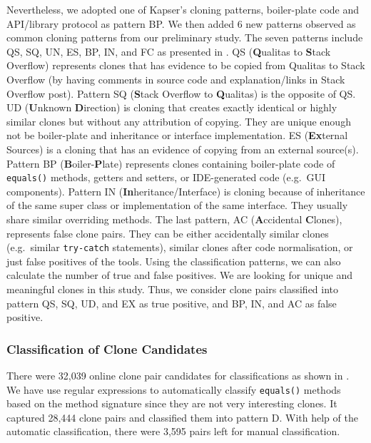 \documentclass{sig-alternate-05-2015}
\begin{document}
Nevertheless, we adopted one of Kapser's cloning patterns, boiler-plate code and API/library protocol as pattern BP. We then added 6 new patterns observed as common cloning patterns from our preliminary study. The seven patterns include QS, SQ, UN, ES, BP, IN, and FC as presented in . QS (\textbf{Q}ualitas to \textbf{S}tack Overflow) represents clones that has evidence to be copied from Qualitas to Stack Overflow (by having comments in source code and explanation/links in Stack Overflow post). Pattern SQ (\textbf{S}tack Overflow to \textbf{Q}ualitas) is the opposite of QS. UD (\textbf{U}nknown \textbf{D}irection) is cloning that creates exactly identical or highly similar clones but without any attribution of copying. They are unique enough not be boiler-plate and inheritance or interface implementation. ES (\textbf{Ex}ternal Sources) is a cloning that has an evidence of copying from an external source(s). Pattern BP (\textbf{B}oiler-\textbf{P}late) represents clones containing boiler-plate code of \verb|equals()| methods, getters and setters, or IDE-generated code (e.g.~GUI components). Pattern IN (\textbf{In}heritance/Interface) is cloning because of inheritance of the same super class or implementation of the same interface. They usually share similar overriding methods. The last pattern, AC (\textbf{A}ccidental \textbf{C}lones), represents false clone pairs. They can be either accidentally similar clones (e.g.~similar \texttt{try-catch} statements), similar clones after code normalisation, or just false positives of the tools. Using the classification patterns, we can also calculate the number of true and false positives. We are looking for unique and meaningful clones in this study. Thus, we consider clone pairs classified into pattern QS, SQ, UD, and EX as true positive, and BP, IN, and AC as false positive.

\subsubsection{Classification of Clone Candidates}

There were 32,039 online clone pair candidates for classifications as shown in . We have use regular expressions to automatically classify \texttt{equals()} methods based on the method signature since they are not very interesting clones. It captured 28,444 clone pairs and classified them into pattern D. With help of the automatic classification, there were 3,595 pairs left for manual classification.
\end{document}
